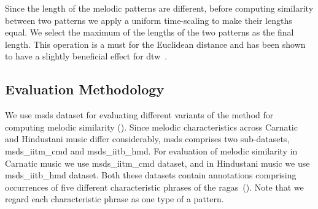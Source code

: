 %

Since the length of the melodic patterns are different, before computing similarity between two patterns we apply a uniform time-scaling to make their lengths equal. We select the maximum of the lengths of the two patterns as the final length. This operation is a must for the Euclidean distance and has been shown to have a slightly beneficial effect for \gls{dtw}~\citep{Ratanamahatana2004,zhu2003query}.


\subsection{Evaluation Methodology}
\label{sec:patterns_melodic_similarity_evaluation_methodology}

We use \acrshort{msds} dataset for evaluating different variants of the method for computing melodic similarity (). Since melodic characteristics across Carnatic and Hindustani music differ considerably, \acrshort{msds} comprises two sub-datasets, \acrshort{msds_iitm_cmd} and \acrshort{msds_iitb_hmd}. For evaluation of melodic similarity in Carnatic music we use \acrshort{msds_iitm_cmd} dataset, and in Hindustani music we use \acrshort{msds_iitb_hmd} dataset. Both these datasets contain annotations comprising occurrences of five different characteristic phrases of the \glspl{raga}~(). Note that we regard each characteristic phrase as one type of a pattern.

